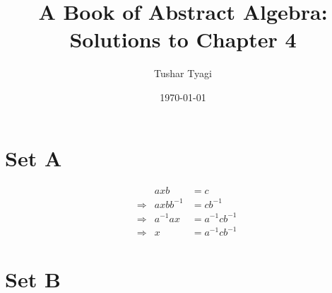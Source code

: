 \documentclass[12pt]{article}
\begin{document}
\title{A Book of Abstract Algebra: Solutions to Chapter 4}
\author{Tushar Tyagi}
\date{\today}
\maketitle

\section*{Set A}
\begin{enumerate}

\begin{item}
\begin{align*}
&&  axb                     &=         c \\
& \Rightarrow   &  axbb^{-1}        &=  cb^{-1}\\
& \Rightarrow    &  a^{-1}ax          &=  a^{-1}cb^{-1}\\
& \Rightarrow    & x                        &=    a^{-1}cb^{-1}
\end{align*}
\end{item}
\end{enumerate}




\section*{Set B}
\end{document}
